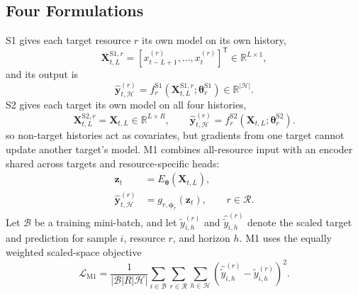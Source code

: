 \documentclass[5p,twocolumn]{elsarticle}
\begin{document}
\subsection{Four Formulations}
\label{sec:formulations}
\label{sec:s1}
\label{sec:s2}
\label{sec:m1}
\label{sec:m0}

S1 gives each target resource $r$ its own model on its own history,
\begin{equation}
  \mathbf{X}_{t,L}^{\mathrm{S1},r}
  = [x_{t-L+1}^{(r)},\ldots,x_t^{(r)}]^{\mathsf T}
  \in\mathbb{R}^{L\times 1},
  \label{eq:s1-input}
\end{equation}
and its output is
\begin{equation}
  \widehat{\mathbf{y}}_{t,\mathcal{H}}^{(r)}
  = f_r^{\mathrm{S1}}
    (\mathbf{X}_{t,L}^{\mathrm{S1},r};\boldsymbol{\theta}_r^{\mathrm{S1}})
  \in\mathbb{R}^{|\mathcal{H}|}.
  \label{eq:s1-forecast}
\end{equation}
S2 gives each target its own model on all four histories,
\begin{equation}
  \mathbf{X}_{t,L}^{\mathrm{S2},r}=\mathbf{X}_{t,L}
  \in\mathbb{R}^{L\times R},
  \qquad
  \widehat{\mathbf{y}}_{t,\mathcal{H}}^{(r)}
  = f_r^{\mathrm{S2}}
    (\mathbf{X}_{t,L};\boldsymbol{\theta}_r^{\mathrm{S2}}).
  \label{eq:s2-forecast}
\end{equation}
so non-target histories act as covariates, but gradients from one target
cannot update another target's model. M1 combines all-resource input with an
encoder shared across targets and resource-specific heads:
\begin{equation}
  \begin{aligned}
    \mathbf{z}_t
      &= E_{\boldsymbol{\theta}}(\mathbf{X}_{t,L}), \\
    \widehat{\mathbf{y}}_{t,\mathcal{H}}^{(r)}
      &= g_{r,\boldsymbol{\phi}_r}(\mathbf{z}_t),
      && r\in\mathcal{R}.
  \end{aligned}
  \label{eq:m1-forecast}
\end{equation}
Let $\mathcal{B}$ be a training mini-batch, and let
$\widetilde{y}_{i,h}^{(r)}$ and
$\widehat{\widetilde{y}}_{i,h}^{(r)}$ denote the scaled target and prediction
for sample $i$, resource $r$, and horizon $h$. M1 uses the equally weighted
scaled-space objective
\begin{equation}
  \mathcal{L}_{\mathrm{M1}}
  = \frac{1}{|\mathcal{B}|R|\mathcal{H}|}
    \sum_{i\in\mathcal{B}}
    \sum_{r\in\mathcal{R}}
    \sum_{h\in\mathcal{H}}
    \left(
      \widehat{\widetilde{y}}_{i,h}^{(r)}
      - \widetilde{y}_{i,h}^{(r)}
    \right)^2.
  \label{eq:m1-loss}
\end{equation}
\end{document}
